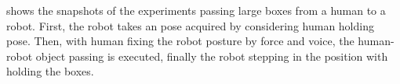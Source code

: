 


{} shows the snapshots of the experiments passing large boxes from a human to a robot. First, the robot takes an pose acquired by considering human holding pose. %
Then, with human fixing the robot posture by force and voice, the human-robot object passing is executed, finally the robot stepping in the position with holding the boxes.



